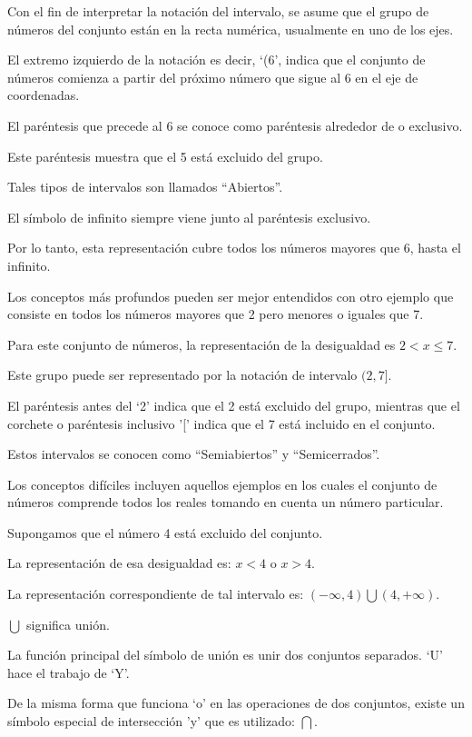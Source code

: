 \documentclass[oneside,spanish,letterpaper]{extbook}
\theoremstyle{mythmstyle}
\begin{document}
Con el fin de interpretar la notación del intervalo, se asume que el grupo de números del conjunto están en
la recta numérica, usualmente en uno de los ejes.

El extremo izquierdo de la notación es decir, ‘(6’, indica que el conjunto de números comienza a partir del
próximo número que sigue al 6 en el eje de coordenadas.

El paréntesis que precede al 6 se conoce como paréntesis alrededor de o exclusivo.

Este paréntesis muestra que el 5 está excluido del grupo.

Tales tipos de intervalos son llamados “Abiertos”.

El símbolo de infinito siempre viene junto al paréntesis exclusivo.

Por lo tanto, esta representación cubre todos los números mayores que 6, hasta el infinito.

Los conceptos más profundos pueden ser mejor entendidos con otro ejemplo que consiste en todos los
números mayores que 2 pero menores o iguales que 7.

Para este conjunto de números, la representación de la desigualdad es $2<x\leq 7$.

Este grupo puede ser representado por la notación de intervalo $(2, 7]$.

El paréntesis antes del ‘2’ indica que el 2 está excluido del grupo, mientras que el corchete
o paréntesis inclusivo ’[’ indica que el 7 está incluido en el conjunto.

Estos intervalos se conocen como “Semiabiertos” y “Semicerrados”.

Los conceptos difíciles incluyen aquellos ejemplos en los cuales el conjunto de números comprende
todos los reales tomando en cuenta un número particular.

Supongamos que el número 4 está excluido del conjunto.

La representación de esa desigualdad es: $x < 4$ o $x > 4$.

La representación correspondiente de tal intervalo es: $(-\infty , 4) \bigcup (4, +\infty )$.

$\bigcup$ significa unión.

La función principal del símbolo de unión es unir dos conjuntos separados. ‘U’ hace el trabajo de ‘Y’.

De la misma forma que funciona ‘o’ en las operaciones de dos conjuntos, existe un símbolo
especial de intersección 'y' que es utilizado: $ \bigcap$.
\end{document}
